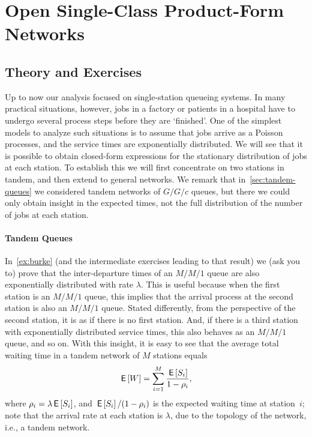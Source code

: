 \section{Open Single-Class Product-Form Networks}
\label{sec:jackson-networks}


\subsection*{Theory and Exercises}



Up to now our analysis focused on single-station queueing systems.
In many practical situations, however, jobs in a factory or patients in a hospital have to undergo several process steps before they are `finished'.
One of the simplest models to analyze such situations is to assume that jobs arrive as a Poisson processes, and the service times are exponentially distributed.
We will see that it is possible to obtain closed-form expressions for the stationary distribution of jobs at each station.
To establish this we will first concentrate on two stations in tandem, and then extend to general networks.
We remark that in~\cref{sec:tandem-queues} we considered tandem networks of $G/G/c$ queues, but there we could only obtain insight in the expected times, not the full distribution of the number of jobs at each station.

\paragraph{Tandem Queues}

In~\cref{ex:burke} (and the intermediate exercises leading to that result) we (ask you to) prove that the inter-departure times of an $M/M/1$ queue are also exponentially distributed with rate $\lambda$.
This is useful because when the first station is an $M/M/1$ queue, this implies that the arrival process at the second station is also an $M/M/1$ queue.
Stated differently, from the perspective of the second station, it is as if there is no first station.
And, if there is a third station with exponentially distributed service times, this also behaves as an $M/M/1$ queue, and so on.
With this insight, it is easy to see that the average total waiting time in a tandem network of $M$ stations equals
\begin{equation*}
  \,\mathsf{E}\left[W\right] = \sum_{i=1}^M \frac{\,\mathsf{E}\left[S_i\right]}{1-\rho_i},
\end{equation*}
where $\rho_i = \lambda \,\mathsf{E}\left[S_i\right]$, and $\,\mathsf{E}\left[S_i\right]/(1-\rho_i)$ is the expected waiting time at station~$i$; note that the arrival rate at each station is $\lambda$, due to the topology of the network, i.e., a tandem network.

